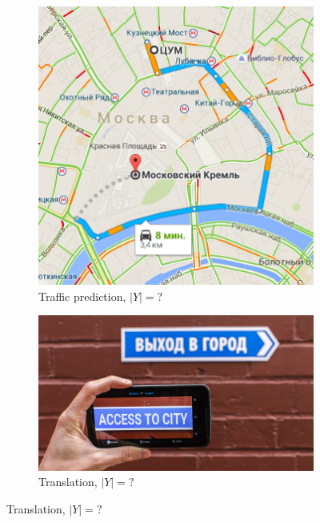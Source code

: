 \documentclass{beamer}
\begin{document}
\begin{frame}
\begin{figure}
		\vspace{0.2cm}
		
		\begin{subfigure}{.49\textwidth}
			\centering  \includegraphics[scale=0.2]{img/trafic} 
			\caption{Traffic prediction, $|Y| = ?$}
		\end{subfigure}
		\begin{subfigure}{.49\textwidth}
			\centering \includegraphics[scale=0.18]{img/transl} 
			\caption{Translation, $|Y| = ?$}
		\end{subfigure}
	\end{figure}
\end{frame}
\end{document}
